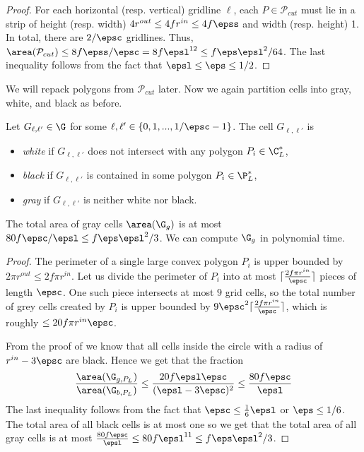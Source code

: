 \begin{proof}
	For each horizontal (resp. vertical) gridline $\ell$, each $P \in \mathcal{P}_{cut}$ must lie in a strip of height (resp. width) $4 r^{out} \le 4f r^{in} \le 4f \epss$ and width (resp. height) 1. In total, there are $2/\epsc$ gridlines.
	Thus, $\area(\mathcal{P}_{cut}) \le 8 f\epss/\epsc = 8 f \epsl^{12}  \le  f \eps \epsl^2/64$. The last inequality follows from the fact that $\epsl \le \eps \le 1/2$.
\end{proof}

We will repack polygons from $\mathcal{P}_{cut}$ later. Now we again partition cells into gray, white, and black as before.

\begin{defn} Let $G_{\ell,\ell'}\in\G$ for some $\ell,\ell'\in\{0,1,...,1/\epsc-1\}$.
	The cell $G_{\ell,\ell'}$ is
	\begin{itemize}
		\item \emph{white} if $G_{\ell,\ell'}$ does not intersect with any polygon
		$P_{i}\in\C_{L}^{*}$,
		\item \emph{black} if $G_{\ell,\ell'}$ is contained in some polygon $P_{i}\in\P_{L}^{*}$,
		\item \emph{gray }if $G_{\ell,\ell'}$ is neither white nor black.
	\end{itemize}
\end{defn} 


\begin{lem} \label{lem:gray-circles-polygon}The total area of gray
	cells $\area(\G_{g})$ is at most  $80 f \epsc/ \epsl \le f \eps \epsl^2/3$. We can compute $\G_g$ in polynomial time.
\end{lem} 
\begin{proof}
	The perimeter of a single large convex polygon $P_i$ is upper bounded by $2 \pi r^{out} \le 2 f \pi r^{in}$. Let us divide the perimeter of $P_i$ into at most $\lceil\frac{2 f \pi r^{in}}{\epsc}\rceil$ pieces of length $\epsc$.
	One such piece intersects at most $9$ grid cells, so the total number of grey cells created by $P_i$ is upper bounded by $9 \epsc^2 \lceil\frac{2 f \pi r^{in}}{\epsc}\rceil$, which is roughly  $\le 20f\pi r^{in}\epsc$. 
	
	From the proof of  we know that all cells inside the circle with a radius of $r^{in}- 3\epsc$ are black. Hence we get that the fraction \[
	\frac{\area(\G_{g, P_L})}{\area(\G_{b, P_L})} \leq \frac{20 f \epsl \epsc}{(\epsl - 3 \epsc)^2} \leq \frac{80 f \epsc}{\epsl}
	\]
	The last inequality follows from the fact that $\epsc \leq \frac{1}{6} \epsl$ or $\eps \leq 1/6$. 
	The total area of all black cells is at most one so we get that the total area of all gray cells is at most $\frac{80 f \epsc}{\epsl} \le 80 f \epsl^{11} \le f \eps \epsl^2 / 3$.
\end{proof}


